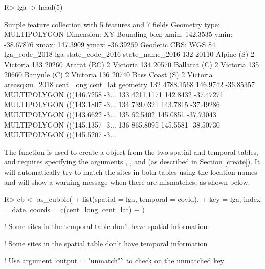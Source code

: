 \documentclass[
  shortnames]{jss}
\begin{document}
\begin{CodeChunk}
\begin{CodeInput}
R> lga |> head(5)
\end{CodeInput}
\begin{CodeOutput}
Simple feature collection with 5 features and 7 fields
Geometry type: MULTIPOLYGON
Dimension:     XY
Bounding box:  xmin: 142.3535 ymin: -38.67876 xmax: 147.3909 ymax: -36.39269
Geodetic CRS:  WGS 84
    lga_code_2018            lga state_code_2016 state_name_2016
132         20110     Alpine (S)               2        Victoria
133         20260    Ararat (RC)               2        Victoria
134         20570   Ballarat (C)               2        Victoria
135         20660    Banyule (C)               2        Victoria
136         20740 Bass Coast (S)               2        Victoria
    areasqkm_2018 cent_long  cent_lat                       geometry
132     4788.1568  146.9742 -36.85357 MULTIPOLYGON (((146.7258 -3...
133     4211.1171  142.8432 -37.47271 MULTIPOLYGON (((143.1807 -3...
134      739.0321  143.7815 -37.49286 MULTIPOLYGON (((143.6622 -3...
135       62.5402  145.0851 -37.73043 MULTIPOLYGON (((145.1357 -3...
136      865.8095  145.5581 -38.50730 MULTIPOLYGON (((145.5207 -3...
\end{CodeOutput}
\end{CodeChunk}

The function  is used to create a  object from the two spatial and temporal tables, and requires specifying the arguments , , and  (as described in Section \ref{create}). It will automatically try to match the sites in both tables using the location names and will show a warning message when there are mismatches, as shown below:

\begin{CodeChunk}
\begin{CodeInput}
R> cb <- as_cubble(
+   list(spatial = lga, temporal = covid),
+   key = lga, index = date, coords = c(cent_long, cent_lat)
+   )
\end{CodeInput}
\begin{CodeOutput}
! Some sites in the temporal table don't have spatial information
\end{CodeOutput}
\begin{CodeOutput}
! Some sites in the spatial table don't have temporal information
\end{CodeOutput}
\begin{CodeOutput}
! Use argument `output = "unmatch"` to check on the unmatched key
\end{CodeOutput}
\end{CodeChunk}
\end{document}
